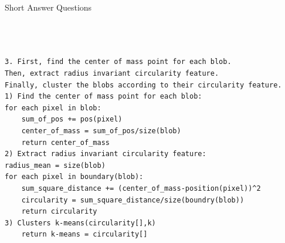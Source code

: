 \documentclass[a4paper,12pt]{article}
\begin{document}
\begin{section}{Short Answer Questions}
\begin{subsection}{2}
\end{subsection}


\begin{subsection}{3}
\begin{lstlisting}[frame=single]  % Start your code-block



3. First, find the center of mass point for each blob.
Then, extract radius invariant circularity feature.
Finally, cluster the blobs according to their circularity feature.
1) Find the center of mass point for each blob:
for each pixel in blob:
	sum_of_pos += pos(pixel)
	center_of_mass = sum_of_pos/size(blob)
	return center_of_mass
2) Extract radius invariant circularity feature:
radius_mean = size(blob)
for each pixel in boundary(blob):
	sum_square_distance += (center_of_mass-position(pixel))^2
	circularity = sum_square_distance/size(boundry(blob))
	return circularity
3) Clusters k-means(circularity[],k)
	return k-means = circularity[]

\end{lstlisting}
\end{subsection}

\end{section}
\end{document}
